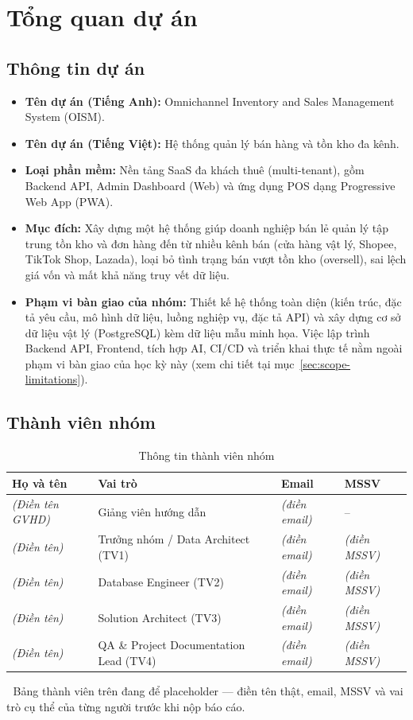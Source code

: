 \section{Tổng quan dự án}
\subsection{Thông tin dự án}
\begin{itemize}
    \item \textbf{Tên dự án (Tiếng Anh):} Omnichannel Inventory and Sales Management System (OISM).
    \item \textbf{Tên dự án (Tiếng Việt):} Hệ thống quản lý bán hàng và tồn kho đa kênh.
    \item \textbf{Loại phần mềm:} Nền tảng SaaS đa khách thuê (multi-tenant), gồm Backend API, Admin Dashboard (Web) và ứng dụng POS dạng Progressive Web App (PWA).
    \item \textbf{Mục đích:} Xây dựng một hệ thống giúp doanh nghiệp bán lẻ quản lý tập trung tồn kho và đơn hàng đến từ nhiều kênh bán (cửa hàng vật lý, Shopee, TikTok Shop, Lazada), loại bỏ tình trạng bán vượt tồn kho (oversell), sai lệch giá vốn và mất khả năng truy vết dữ liệu.
    \item \textbf{Phạm vi bàn giao của nhóm:} Thiết kế hệ thống toàn diện (kiến trúc, đặc tả yêu cầu, mô hình dữ liệu, luồng nghiệp vụ, đặc tả API) và xây dựng cơ sở dữ liệu vật lý (PostgreSQL) kèm dữ liệu mẫu minh họa. Việc lập trình Backend API, Frontend, tích hợp AI, CI/CD và triển khai thực tế nằm ngoài phạm vi bàn giao của học kỳ này (xem chi tiết tại mục~\ref{sec:scope-limitations}).
\end{itemize}

\subsection{Thành viên nhóm}
\begin{table}[htbp]
    \centering
    \small
    \caption{Thông tin thành viên nhóm}
    \begin{tabular}{|p{3.4cm}|p{3.6cm}|p{4.6cm}|p{2.4cm}|}
        \hline
        \textbf{Họ và tên} & \textbf{Vai trò} & \textbf{Email} & \textbf{MSSV} \\
        \hline
        \textit{(Điền tên GVHD)} & Giảng viên hướng dẫn & \textit{(điền email)} & -- \\
        \hline
        \textit{(Điền tên)} & Trưởng nhóm / Data Architect (TV1) & \textit{(điền email)} & \textit{(điền MSSV)} \\
        \hline
        \textit{(Điền tên)} & Database Engineer (TV2) & \textit{(điền email)} & \textit{(điền MSSV)} \\
        \hline
        \textit{(Điền tên)} & Solution Architect (TV3) & \textit{(điền email)} & \textit{(điền MSSV)} \\
        \hline
        \textit{(Điền tên)} & QA \& Project Documentation Lead (TV4) & \textit{(điền email)} & \textit{(điền MSSV)} \\
        \hline
    \end{tabular}
\end{table}

\begin{imgnote}
📌 Bảng thành viên trên đang để placeholder — điền tên thật, email, MSSV và vai trò cụ thể của từng người trước khi nộp báo cáo.
\end{imgnote}
